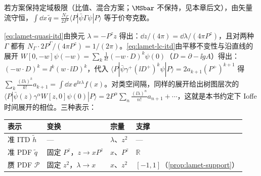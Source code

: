 \begin{definition}
\begin{enumerate}[label=(\roman*),leftmargin=2em,itemsep=1pt,topsep=2pt]
\end{enumerate}
若方案保持定域极限（比值、混合方案；$\MSbar$ 不保持，见本章后文），由矢量流守恒，$\int\dd x\,\tilde q=\frac{N_\Gamma}{2P^z}\langle P|\bar\psi\Gamma\psi|P\rangle$ 等于价夸克数。
\end{definition}

\cref{eq:lamet-quasi-itd}由换元 $\lambda=-P^zz$ 得出：$\dd z/(4\pi)=\dd\lambda/(4\pi P^z)$，且对两种 $\Gamma$ 都有 $N_\Gamma\cdot2P^\Gamma/(4\pi P^z)=1/(2\pi)$。\cref{eq:lamet-lc-itd}由平移不变性与沿直线的展开 $W[0,-w]\psi(-w)=\sum_k\frac1{k!}(-w\cdot D)^k\psi(0)$（$D=\partial-\ii gA$）得出：$(-w\cdot D)^k=\ii^k(w\cdot\ii D)^k$，代入 $\langle P|\bar\psi\gamma^+(\ii D^+)^k\psi|P\rangle=2a_{k+1}(P^+)^{k+1}$ 得 $\sum_k\frac{(\ii\lambda)^k}{k!}a_{k+1}=\int\dd x\,\ee^{\ii x\lambda}f(x)$。对类空间隔，同样的展开给出树图层次的 $\langle P|\bar\psi(z)\gamma^\alpha W[z,0]\psi(0)|P\rangle=2P^\alpha\sum_n\frac{(\ii\lambda)^n}{n!}a_{n+1}+\cdots$，这就是本书约定下 Ioffe 时间展开的相位。三种表示：
\begin{center}
\small
\begin{tabular}{@{}llll@{}}
\toprule
表示 & 变换 & 宗量 & 支撑 \\
\midrule
准 ITD $\tilde h$ & — & $\lambda$、$z^2$ & — \\
准 PDF $\tilde q$ & 固定 $P^z$，$z\to xP^z$ & $x$、$P^z$ & $\mathbb R$ \\
赝 PDF $\mathcal P$ & 固定 $z^2$，$\lambda\to x$ & $x$、$z^2$ & $[-1,1]$（\cref{prop:lamet-support}） \\
\bottomrule
\end{tabular}
\end{center}

